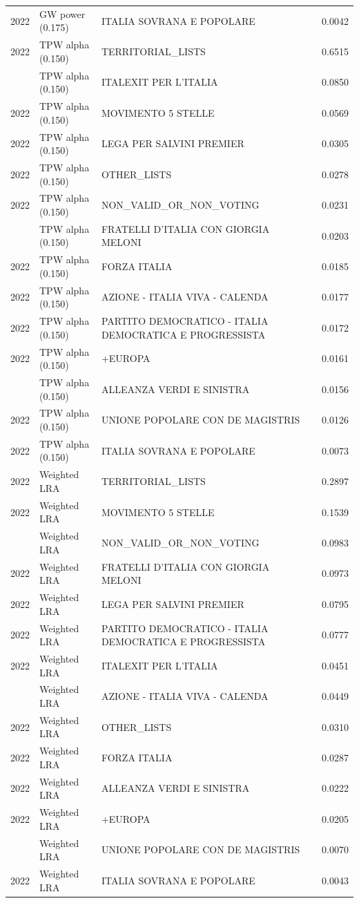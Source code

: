 \begin{longtable}[t]{rllr}
2022 & GW power (0.175) & ITALIA SOVRANA E POPOLARE & 0.0042\\
2022 & TPW alpha (0.150) & TERRITORIAL\_LISTS & 0.6515\\
\addlinespace
2022 & TPW alpha (0.150) & ITALEXIT PER L'ITALIA & 0.0850\\
2022 & TPW alpha (0.150) & MOVIMENTO 5 STELLE & 0.0569\\
2022 & TPW alpha (0.150) & LEGA PER SALVINI PREMIER & 0.0305\\
2022 & TPW alpha (0.150) & OTHER\_LISTS & 0.0278\\
2022 & TPW alpha (0.150) & NON\_VALID\_OR\_NON\_VOTING & 0.0231\\
\addlinespace
2022 & TPW alpha (0.150) & FRATELLI D'ITALIA CON GIORGIA MELONI & 0.0203\\
2022 & TPW alpha (0.150) & FORZA ITALIA & 0.0185\\
2022 & TPW alpha (0.150) & AZIONE - ITALIA VIVA - CALENDA & 0.0177\\
2022 & TPW alpha (0.150) & PARTITO DEMOCRATICO - ITALIA DEMOCRATICA E PROGRESSISTA & 0.0172\\
2022 & TPW alpha (0.150) & +EUROPA & 0.0161\\
\addlinespace
2022 & TPW alpha (0.150) & ALLEANZA VERDI E SINISTRA & 0.0156\\
2022 & TPW alpha (0.150) & UNIONE POPOLARE CON DE MAGISTRIS & 0.0126\\
2022 & TPW alpha (0.150) & ITALIA SOVRANA E POPOLARE & 0.0073\\
2022 & Weighted LRA & TERRITORIAL\_LISTS & 0.2897\\
2022 & Weighted LRA & MOVIMENTO 5 STELLE & 0.1539\\
\addlinespace
2022 & Weighted LRA & NON\_VALID\_OR\_NON\_VOTING & 0.0983\\
2022 & Weighted LRA & FRATELLI D'ITALIA CON GIORGIA MELONI & 0.0973\\
2022 & Weighted LRA & LEGA PER SALVINI PREMIER & 0.0795\\
2022 & Weighted LRA & PARTITO DEMOCRATICO - ITALIA DEMOCRATICA E PROGRESSISTA & 0.0777\\
2022 & Weighted LRA & ITALEXIT PER L'ITALIA & 0.0451\\
\addlinespace
2022 & Weighted LRA & AZIONE - ITALIA VIVA - CALENDA & 0.0449\\
2022 & Weighted LRA & OTHER\_LISTS & 0.0310\\
2022 & Weighted LRA & FORZA ITALIA & 0.0287\\
2022 & Weighted LRA & ALLEANZA VERDI E SINISTRA & 0.0222\\
2022 & Weighted LRA & +EUROPA & 0.0205\\
\addlinespace
2022 & Weighted LRA & UNIONE POPOLARE CON DE MAGISTRIS & 0.0070\\
2022 & Weighted LRA & ITALIA SOVRANA E POPOLARE & 0.0043\\
\bottomrule
\end{longtable}

